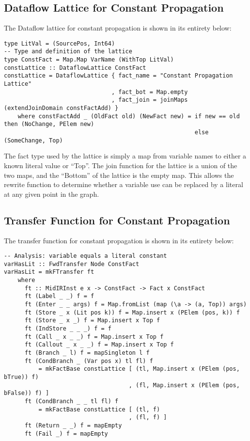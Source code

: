 \documentclass[11pt]{article}
\begin{document}
\subsection { Dataflow Lattice for Constant Propagation } 

The Dataflow lattice for constant propagation is shown in its entirety below:

{\small
\begin{verbatim}
type LitVal = (SourcePos, Int64)
-- Type and definition of the lattice
type ConstFact = Map.Map VarName (WithTop LitVal)
constLattice :: DataflowLattice ConstFact
constLattice = DataflowLattice { fact_name = "Constant Propagation Lattice"
                               , fact_bot = Map.empty 
                               , fact_join = joinMaps (extendJoinDomain constFactAdd) }
    where constFactAdd _ (OldFact old) (NewFact new) = if new == old then (NoChange, PElem new)
                                                       else (SomeChange, Top)
\end{verbatim}}

The fact type used by the lattice is simply a map from variable names to either a known literal value or ``Top''. The join function for the lattice is a union of the two maps, and the ``Bottom'' of the lattice is the empty map. This allows the rewrite function to determine whether a variable use can be replaced by a literal at any given point in the graph.  

\subsection { Transfer Function for Constant Propagation }

The transfer function for constant propagation is shown in its entirety below: 

\begin{verbatim}
-- Analysis: variable equals a literal constant
varHasLit :: FwdTransfer Node ConstFact
varHasLit = mkFTransfer ft
    where
      ft :: MidIRInst e x -> ConstFact -> Fact x ConstFact
      ft (Label _ _) f = f
      ft (Enter _ _ args) f = Map.fromList (map (\a -> (a, Top)) args)
      ft (Store _ x (Lit pos k)) f = Map.insert x (PElem (pos, k)) f
      ft (Store _ x _) f = Map.insert x Top f
      ft (IndStore _ _ _) f = f
      ft (Call _ x _ _) f = Map.insert x Top f
      ft (Callout _ x _ _) f = Map.insert x Top f 
      ft (Branch _ l) f = mapSingleton l f
      ft (CondBranch _ (Var pos x) tl fl) f 
          = mkFactBase constLattice [ (tl, Map.insert x (PElem (pos, bTrue)) f)
                                    , (fl, Map.insert x (PElem (pos, bFalse)) f) ]
      ft (CondBranch _ _ tl fl) f 
          = mkFactBase constLattice [ (tl, f)
                                    , (fl, f) ]
      ft (Return _ _) f = mapEmpty
      ft (Fail _) f = mapEmpty

\end{verbatim}
\end{document}

